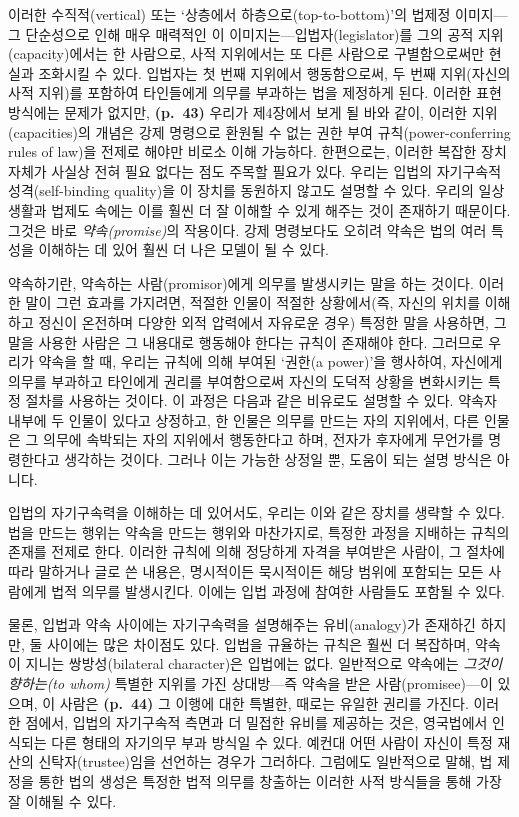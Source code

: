\documentclass[12pt, oneside]{book}  %
\begin{document}
이러한 수직적(vertical) 또는 `상층에서 하층으로(top-to-bottom)'의 법제정
이미지---그 단순성으로 인해 매우 매력적인 이
이미지는---입법자(legislator)를 그의 공적 지위(capacity)에서는 한
사람으로, 사적 지위에서는 또 다른 사람으로 구별함으로써만 현실과
조화시킬 수 있다. 입법자는 첫 번째 지위에서 행동함으로써, 두 번째
지위(자신의 사적 지위)를 포함하여 타인들에게 의무를 부과하는 법을
제정하게 된다. 이러한 표현 방식에는 문제가 없지만, \textbf{(p.~43)}
우리가 제4장에서 보게 될 바와 같이, 이러한 지위(capacities)의 개념은
강제 명령으로 환원될 수 없는 권한 부여 규칙(power-conferring rules of
law)을 전제로 해야만 비로소 이해 가능하다. 한편으로는, 이러한 복잡한
장치 자체가 사실상 전혀 필요 없다는 점도 주목할 필요가 있다. 우리는
입법의 자기구속적 성격(self-binding quality)을 이 장치를 동원하지 않고도
설명할 수 있다. 우리의 일상생활과 법제도 속에는 이를 훨씬 더 잘 이해할
수 있게 해주는 것이 존재하기 때문이다. 그것은 바로
\emph{약속(promise)}의 작용이다. 강제 명령보다도 오히려 약속은 법의 여러
특성을 이해하는 데 있어 훨씬 더 나은 모델이 될 수 있다.

약속하기란, 약속하는 사람(promisor)에게 의무를 발생시키는 말을 하는
것이다. 이러한 말이 그런 효과를 가지려면, 적절한 인물이 적절한
상황에서(즉, 자신의 위치를 이해하고 정신이 온전하며 다양한 외적 압력에서
자유로운 경우) 특정한 말을 사용하면, 그 말을 사용한 사람은 그 내용대로
행동해야 한다는 규칙이 존재해야 한다. 그러므로 우리가 약속을 할 때,
우리는 규칙에 의해 부여된 `권한(a power)'을 행사하여, 자신에게 의무를
부과하고 타인에게 권리를 부여함으로써 자신의 도덕적 상황을 변화시키는
특정 절차를 사용하는 것이다. 이 과정은 다음과 같은 비유로도 설명할 수
있다. 약속자 내부에 두 인물이 있다고 상정하고, 한 인물은 의무를 만드는
자의 지위에서, 다른 인물은 그 의무에 속박되는 자의 지위에서 행동한다고
하며, 전자가 후자에게 무언가를 명령한다고 생각하는 것이다. 그러나 이는
가능한 상정일 뿐, 도움이 되는 설명 방식은 아니다.

입법의 자기구속력을 이해하는 데 있어서도, 우리는 이와 같은 장치를 생략할
수 있다. 법을 만드는 행위는 약속을 만드는 행위와 마찬가지로, 특정한
과정을 지배하는 규칙의 존재를 전제로 한다. 이러한 규칙에 의해 정당하게
자격을 부여받은 사람이, 그 절차에 따라 말하거나 글로 쓴 내용은,
명시적이든 묵시적이든 해당 범위에 포함되는 모든 사람에게 법적 의무를
발생시킨다. 이에는 입법 과정에 참여한 사람들도 포함될 수 있다.

물론, 입법과 약속 사이에는 자기구속력을 설명해주는 유비(analogy)가
존재하긴 하지만, 둘 사이에는 많은 차이점도 있다. 입법을 규율하는 규칙은
훨씬 더 복잡하며, 약속이 지니는 쌍방성(bilateral character)은 입법에는
없다. 일반적으로 약속에는 \emph{그것이 향하는(to whom)} 특별한 지위를
가진 상대방---즉 약속을 받은 사람(promisee)---이 있으며, 이 사람은
\textbf{(p.~44)} 그 이행에 대한 특별한, 때로는 유일한 권리를 가진다.
이러한 점에서, 입법의 자기구속적 측면과 더 밀접한 유비를 제공하는 것은,
영국법에서 인식되는 다른 형태의 자기의무 부과 방식일 수 있다. 예컨대
어떤 사람이 자신이 특정 재산의 신탁자(trustee)임을 선언하는 경우가
그러하다. 그럼에도 일반적으로 말해, 법 제정을 통한 법의 생성은 특정한
법적 의무를 창출하는 이러한 사적 방식들을 통해 가장 잘 이해될 수 있다.
\end{document}
